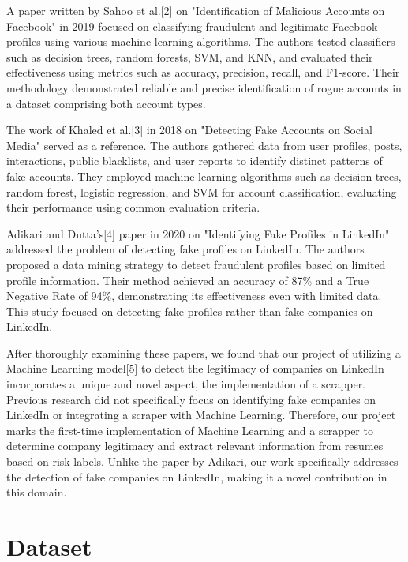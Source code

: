 \documentclass{article}
\begin{document}
A paper written by Sahoo et al.[2] on "Identification of Malicious Accounts on Facebook" in 2019 focused on classifying fraudulent and legitimate Facebook profiles using various machine learning algorithms. The authors tested classifiers such as decision trees, random forests, SVM, and KNN, and evaluated their effectiveness using metrics such as accuracy, precision, recall, and F1-score. Their methodology demonstrated reliable and precise identification of rogue accounts in a dataset comprising both account types.

The work of Khaled et al.[3] in 2018 on "Detecting Fake Accounts on Social Media" served as a reference. The authors gathered data from user profiles, posts, interactions, public blacklists, and user reports to identify distinct patterns of fake accounts. They employed machine learning algorithms such as decision trees, random forest, logistic regression, and SVM for account classification, evaluating their performance using common evaluation criteria.

Adikari and Dutta's[4] paper in 2020 on "Identifying Fake Profiles in LinkedIn" addressed the problem of detecting fake profiles on LinkedIn. The authors proposed a data mining strategy to detect fraudulent profiles based on limited profile information. Their method achieved an accuracy of 87\% and a True Negative Rate of 94\%, demonstrating its effectiveness even with limited data. This study focused on detecting fake profiles rather than fake companies on LinkedIn.

After thoroughly examining these papers, we found that our project of utilizing a Machine Learning model[5] to detect the legitimacy of companies on LinkedIn incorporates a unique and novel aspect, the implementation of a scrapper. Previous research did not specifically focus on identifying fake companies on LinkedIn or integrating a scraper with Machine Learning. Therefore, our project marks the first-time implementation of Machine Learning and a scrapper to determine company legitimacy and extract relevant information from resumes based on risk labels. Unlike the paper by Adikari, our work specifically addresses the detection of fake companies on LinkedIn, making it a novel contribution in this domain.



\section{Dataset}
\end{document}
